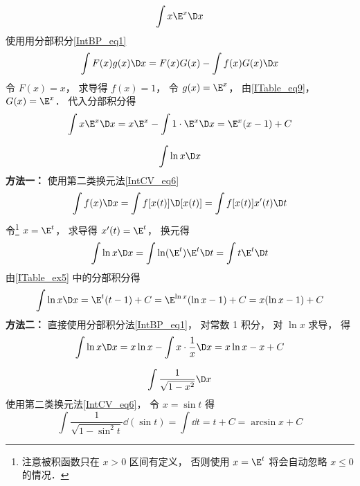 \begin{exam}{}\label{ITable_ex5}
\begin{equation}
\int x\E^x \D x
\end{equation}
使用用分部积分\autoref{IntBP_eq1}
\begin{equation}
\int {F(x)g(x)\D x}  = F(x)G(x) - \int {f(x)G(x)\D x}
\end{equation}
令 $F(x) = x$， 求导得 $f(x) = 1$， 令 $g(x) = \E^x$， 由\autoref{ITable_eq9}， $G(x) = \E^x$． 代入分部积分得
\begin{equation}
\int x\E^x \D x = x\E^x - \int 1\cdot \E^x \D x = \E^x(x - 1) + C
\end{equation}
\end{exam}

\begin{exam}{}\label{ITable_ex6}
\begin{equation}
\int \ln x \D x
\end{equation}
\textbf{方法一：} 使用第二类换元法\autoref{IntCV_eq6}
\begin{equation}
\int f(x)\D x = \int f[x(t)]\D [x(t)] = \int f[x(t)]x'(t)\D t
\end{equation}
令\footnote{注意被积函数只在 $x>0$ 区间有定义， 否则使用 $x = \E^t$ 将会自动忽略 $x\le 0$ 的情况．} $x = \E^t$， 求导得 $x'(t) = \E^t$， 换元得
\begin{equation}
\int \ln x \D x = \int \ln(\E^t) \E^t  \D t = \int t \E^t  \D t
\end{equation}
由\autoref{ITable_ex5} 中的分部积分得
\begin{equation}
\int \ln x \D x = \E^t (t-1) + C = \E^{\ln x} (\ln x -1) + C = x (\ln x-1) + C
\end{equation}
\textbf{方法二：} 直接使用分部积分法\autoref{IntBP_eq1}， 对常数 1 积分， 对 $\ln x$ 求导， 得
\begin{equation}
\int \ln x \D x = x\ln x - \int x\cdot \frac 1x \D x = x\ln x - x + C
\end{equation}
\end{exam}

\begin{exam}{}\label{ITable_ex8}
\begin{equation}
\int \frac{1}{\sqrt{1-x^2}} \D x 
\end{equation}
使用第二类换元法\autoref{IntCV_eq6}， 令 $x = \sin t$ 得
\begin{equation}
\int \frac{1}{\sqrt{1-\sin^2 t}} \dd(\sin t) = \int \dd{t} = t + C = \arcsin x + C
\end{equation}
\end{exam}

